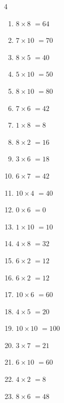 \begin{multicols}{4}
\begin{enumerate}
  \item $8\times 8$
        $=64$

  \item $7\times 10$
        $=70$

  \item $8\times 5$
        $=40$

  \item $5\times 10$
        $=50$

  \item $8\times 10$
        $=80$

  \item $7\times 6$
        $=42$

\columnbreak %

  \item $1\times 8$
        $=8$

  \item $8\times 2$
        $=16$

  \item $3\times 6$
        $=18$

  \item $6\times 7$
        $=42$

  \item $10\times 4$
        $=40$

  \item $0\times 6$
        $=0$

  \item $1\times 10$
        $=10$

  \item $4\times 8$
        $=32$

  \item $6\times 2$
        $=12$

  \item $6\times 2$
        $=12$

  \item $10\times 6$
        $=60$

  \item $4\times 5$
        $=20$

  \item $10\times 10$
        $=100$

  \item $3\times 7$
        $=21$

  \item $6\times 10$
        $=60$

  \item $4\times 2$
        $=8$

  \item $8\times 6$
        $=48$


\end{enumerate}
\end{multicols}

